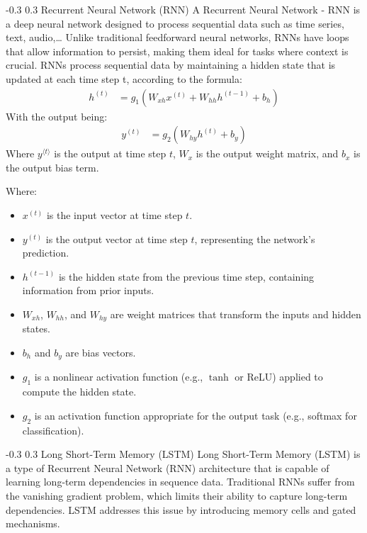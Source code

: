 \documentclass[twocolumn]{llncs}
\makeatletter
\renewcommand{\subsection}{\@startsection{subsection}{2}{\z@}%
  {-0.3\baselineskip}  %
  {0.3\baselineskip}   %
  {\normalfont\normalsize\bfseries}}
\makeatother
\begin{document}
\subsection{Recurrent Neural Network (RNN)}
A Recurrent Neural Network - RNN is a deep neural network designed to process sequential data such as time series, text, audio,… Unlike traditional feedforward neural networks, RNNs have loops that allow information to persist, making them ideal for tasks where context is crucial.
RNNs process sequential data by maintaining a hidden state that is updated at each time step t, according to the formula:
\begin{align}
h^{(t)} &= g_1\left(W_{xh} x^{(t)} + W_{hh} h^{(t-1)} + b_h\right)
\end{align}
With the output being:
\begin{align}
    y^{(t)} &= g_2\left(W_{hy} h^{(t)} + b_y\right)
\end{align}
Where \( y^{\langle t \rangle} \) is the output at time step \( t \), \( W_x \) is the output weight matrix, and \( b_x \) is the output bias term.

\noindent Where:
\begin{itemize}
    \item \( x^{(t)} \) is the input vector at time step \( t \).
    \item \( y^{(t)} \) is the output vector at time step \( t \), representing the network's prediction.

    \item \( h^{(t-1)} \) is the hidden state from the previous time step, containing information from prior inputs.
    \item \( W_{xh} \), \( W_{hh} \), and \( W_{hy} \) are weight matrices that transform the inputs and hidden states.
    \item \( b_h \) and \( b_y \) are bias vectors.
    \item \( g_1 \) is a nonlinear activation function (e.g., \(\tanh\) or ReLU) applied to compute the hidden state.
    \item \( g_2 \) is an activation function appropriate for the output task (e.g., softmax for classification).
\end{itemize}


\subsection{Long Short-Term Memory (LSTM)}
Long Short-Term Memory (LSTM) is a type of Recurrent Neural Network (RNN) architecture that is capable of learning long-term dependencies in sequence data. Traditional RNNs suffer from the vanishing gradient problem, which limits their ability to capture long-term dependencies. LSTM addresses this issue by introducing memory cells and gated mechanisms.
\end{document}
